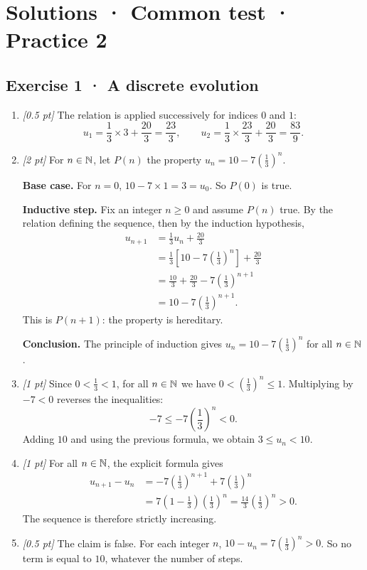 \ifprof\clearpage

\section*{Solutions · Common test · Practice 2}\label{cor:3-2}

\subsection*{Exercise 1 · A discrete evolution}\begin{enumerate}

\item \textit{[0.5 pt]} The relation is applied successively for indices $0$ and $1$:\[u_1=\frac{1}{3}\times 3+\frac{20}{3}=\frac{23}{3},\qquad u_2=\frac{1}{3}\times \frac{23}{3}+\frac{20}{3}=\frac{83}{9}.\]

\item \textit{[2 pt]} For $n\in\mathbb N$, let $P(n)$ the property $u_n=10-7\left(\frac{1}{3}\right)^n$.
\par\smallskip\textbf{Base case.} For $n=0$, $10-7\times1=3=u_0$. So $P(0)$ is true.
\par\smallskip\textbf{Inductive step.} Fix an integer $n\ge0$ and assume $P(n)$ true. By the relation defining the sequence, then by the induction hypothesis,
\[\begin{aligned}u_{n+1}&=\frac{1}{3}u_n+\frac{20}{3}\\
&=\frac{1}{3}\left[10-7\left(\frac{1}{3}\right)^n\right]+\frac{20}{3}\\
&=\frac{10}{3}+\frac{20}{3}-7\left(\frac{1}{3}\right)^{n+1}\\
&=10-7\left(\frac{1}{3}\right)^{n+1}.
\end{aligned}\]
This is $P(n+1)$: the property is hereditary.
\par\smallskip\textbf{Conclusion.} The principle of induction gives $u_n=10-7\left(\frac{1}{3}\right)^n$ for all $n\in\mathbb N$.

\item \textit{[1 pt]} Since $0<\frac{1}{3}<1$, for all $n\in\mathbb N$ we have $0<(\frac{1}{3})^n\le1$. Multiplying by $-7<0$ reverses the inequalities:
\[-7\le-7(\frac{1}{3})^n<0.\]
Adding $10$ and using the previous formula, we obtain $3\le u_n<10$.

\item \textit{[1 pt]} For all $n\in\mathbb N$, the explicit formula gives
\[\begin{aligned}u_{n+1}-u_n&=-7(\frac{1}{3})^{n+1}+7(\frac{1}{3})^n\\&=7(1-\frac{1}{3})(\frac{1}{3})^n=\frac{14}{3}(\frac{1}{3})^n>0.\end{aligned}\]
The sequence is therefore strictly increasing.

\item \textit{[0.5 pt]} The claim is false. For each integer $n$, $10-u_n=7(\frac{1}{3})^n>0$. So no term is equal to $10$, whatever the number of steps.

\end{enumerate}

